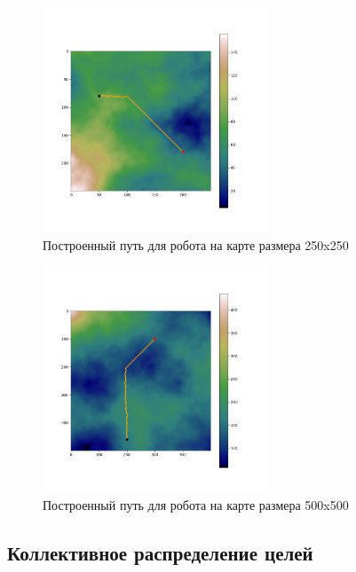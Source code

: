 \documentclass{article}
\numberwithin{equation}{section}
\begin{document}
			\begin{figure}[H]
				\centering
				\vspace{-0.5cm}
				\includegraphics[width=0.6\textwidth]{data/path_example/250x250.png}
				\vspace{-0.5cm}
				\caption{Построенный путь для робота на карте размера 250x250}\label{fig:rob1}
			\end{figure}

			\begin{figure}[H]
				\centering
				\vspace{-0.5cm}
				\includegraphics[width=0.6\textwidth]{data/path_example/500x500.png}
				\vspace{-0.5cm}
				\caption{Построенный путь для робота на карте размера 500x500}\label{fig:rob2}
			\end{figure}

		\subsection{Коллективное распределение целей}
\end{document}
